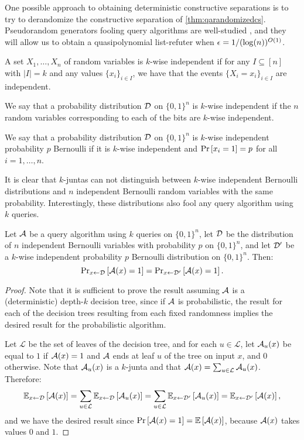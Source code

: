 One possible approach to obtaining deterministic constructive
separations is to try to derandomize 
the constructive separation of \cref{thm:qarandomizedcs}.
Pseudorandom generators fooling query algorithms are well-studied
\cite{Hatami2023}, and they will allow us to obtain a quasipolynomial
list-refuter when $\epsilon = 1/(\log(n))^{O(1)}$.

\begin{definition}
A set $X_1, \ldots, X_n$ of random variables is $k$-wise independent if for any $I \subseteq [n]$
with $|I| = k$ and any values $\{x_i\}_{i\in I}$, we have that the events $\{X_i = x_i\}_{i \in I}$ are independent.

We say that a probability distribution $\mathcal{D}$ on $\{0, 1\}^n$ is $k$-wise independent if the $n$ random variables 
corresponding to each of the bits are $k$-wise independent. 

We say that a probability distribution $\mathcal{D}$ on $\{0, 1\}^n$ is $k$-wise independent probability $p$ Bernoulli
if it is $k$-wise independent and $\text{Pr}\left[x_i = 1\right] = p$ for all $i =1 , \dots, n$. 
\end{definition}

It is clear that $k$-juntas can not distinguish between $k$-wise independent Bernoulli distributions 
and $n$ independent Bernoulli random variables with the same probability. Interestingly, 
these distributions also fool any query algorithm using $k$ queries. 

\begin{theorem}
Let $\mathcal{A}$ be a query algorithm using $k$ queries on $\{0, 1\}^n$, 
let $\mathcal{D}$ be the distribution of $n$ independent 
Bernoulli variables with probability $p$ on $\{0, 1\}^n$, and let
$\mathcal{D}'$ be a $k$-wise independent probability $p$ Bernoulli distribution on $\{0, 1\}^n$. Then:
$$
\text{Pr}_{x \leftarrow \mathcal{D}}\left[\mathcal{A}(x) = 1\right] = \text{Pr}_{x \leftarrow \mathcal{D}'}\left[\mathcal{A}(x) = 1\right].
$$
\end{theorem}
\begin{proof}
Note that it is sufficient to prove the result assuming $\mathcal{A}$ is a (deterministic) depth-$k$ decision tree,
since if $\mathcal{A}$ is probabilistic, the result for each of the decision trees resulting from each fixed randomness
implies the desired result for the probabilistic algorithm.

Let $\mathcal{L}$ be the set of leaves of the decision tree, and for each $u \in \mathcal{L}$,
let $\mathcal{A}_u(x)$ be equal
to $1$ if $\mathcal{A}(x) = 1$ and $\mathcal{A}$ ends at leaf $u$ of the tree on input $x$, and $0$ otherwise.
Note that $\mathcal{A}_u(x)$ is a $k$-junta
and that $\mathcal{A}(x) = \sum_{u\in \mathcal{L}} \mathcal{A}_u(x)$. Therefore:
$$
\mathbb{E}_{x \leftarrow \mathcal{D}}\left[\mathcal{A}(x)\right] = \sum_{u \in \mathcal{L}} \mathbb{E}_{x \leftarrow \mathcal{D}}\left[\mathcal{A}_u(x)\right] = \sum_{u \in \mathcal{L}} \mathbb{E}_{x \leftarrow \mathcal{D}'}\left[\mathcal{A}_u(x)\right] = \mathbb{E}_{x \leftarrow \mathcal{D}'}\left[\mathcal{A}(x)\right],
$$
and we have the desired result since  $\text{Pr}\left[\mathcal{A}(x) = 1\right] = \mathbb{E}\left[\mathcal{A}(x)\right]$,
because $\mathcal{A}(x)$ takes values $0$ and $1$.
\end{proof}

